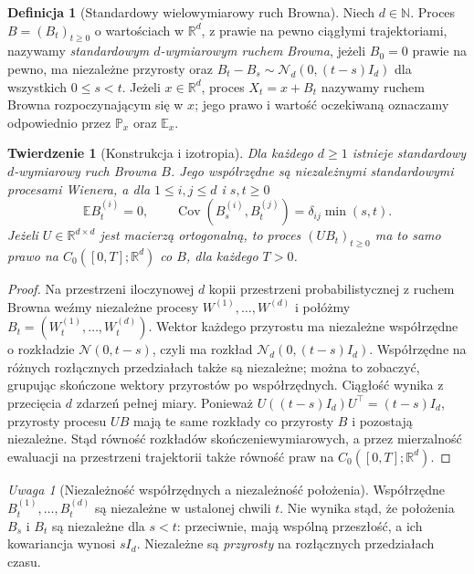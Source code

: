 \documentclass[11pt,a4paper,oneside]{report}
\numberwithin{equation}{chapter}
\theoremstyle{plain}
\newtheorem{twierdzenie}{Twierdzenie}[chapter]
\theoremstyle{definition}
\newtheorem{definicja}{Definicja}[chapter]
\theoremstyle{remark}
\newtheorem{uwaga}{Uwaga}[chapter]
\newcommand{\R}{\mathbb{R}}
\newcommand{\N}{\mathbb{N}}
\newcommand{\Prob}{\mathbb{P}}
\newcommand{\E}{\mathbb{E}}
\newcommand{\Cov}{\operatorname{Cov}}
\newcommand{\Normal}{\mathcal{N}}
\begin{document}
\begin{definicja}[Standardowy wielowymiarowy ruch Browna]
Niech $d\in\N$. Proces $B=(B_t)_{t\ge0}$ o wartościach
w $\R^d$, z prawie na pewno ciągłymi trajektoriami, nazywamy
\emph{standardowym $d$-wymiarowym ruchem Browna}, jeżeli
$B_0=0$ prawie na pewno, ma niezależne przyrosty oraz
$B_t-B_s\sim\Normal_d(0,(t-s)I_d)$ dla wszystkich $0\le s<t$.
Jeżeli $x\in\R^d$, proces $X_t=x+B_t$ nazywamy ruchem Browna
rozpoczynającym się w $x$; jego prawo i wartość oczekiwaną oznaczamy
odpowiednio przez $\Prob_x$ oraz $\E_x$.
\end{definicja}

\begin{twierdzenie}[Konstrukcja i izotropia]
Dla każdego $d\ge1$ istnieje standardowy $d$-wymiarowy ruch
Browna $B$. Jego współrzędne są niezależnymi standardowymi
procesami Wienera, a dla $1\le i,j\le d$ i $s,t\ge0$
\[
\E B_t^{(i)}=0,\qquad
\Cov(B_s^{(i)},B_t^{(j)})=\delta_{ij}\min(s,t).
\]
Jeżeli $U\in\R^{d\times d}$ jest macierzą ortogonalną,
to proces $(UB_t)_{t\ge0}$ ma to samo prawo na
$C_0([0,T];\R^d)$ co $B$, dla każdego $T>0$.
\end{twierdzenie}
\begin{proof}
Na przestrzeni iloczynowej $d$ kopii przestrzeni probabilistycznej
z ruchem Browna weźmy niezależne procesy $W^{(1)},\ldots,W^{(d)}$
i połóżmy $B_t=(W_t^{(1)},\ldots,W_t^{(d)})$.
Wektor każdego przyrostu ma niezależne współrzędne o rozkładzie
$\Normal(0,t-s)$, czyli ma rozkład $\Normal_d(0,(t-s)I_d)$.
Współrzędne na różnych rozłącznych przedziałach także są niezależne;
można to zobaczyć, grupując skończone wektory przyrostów po
współrzędnych. Ciągłość wynika z przecięcia $d$ zdarzeń pełnej miary.
Ponieważ $U((t-s)I_d)U^\top=(t-s)I_d$, przyrosty procesu $UB$
mają te same rozkłady co przyrosty $B$ i pozostają niezależne.
Stąd równość rozkładów skończeniewymiarowych, a przez mierzalność
ewaluacji na przestrzeni trajektorii także równość praw na
$C_0([0,T];\R^d)$.
\end{proof}

\begin{uwaga}[Niezależność współrzędnych a niezależność położenia]
Współrzędne $B_t^{(1)},\ldots,B_t^{(d)}$ są niezależne w ustalonej
chwili $t$. Nie wynika stąd, że położenia $B_s$ i $B_t$ są niezależne
dla $s<t$: przeciwnie, mają wspólną przeszłość, a ich kowariancja
wynosi $sI_d$. Niezależne są \emph{przyrosty} na rozłącznych
przedziałach czasu.
\end{uwaga}
\end{document}
